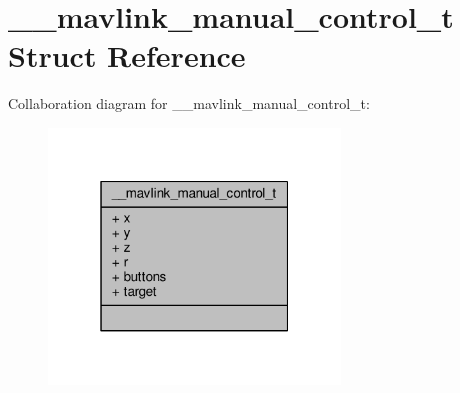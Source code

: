 \hypertarget{struct____mavlink__manual__control__t}{\section{\+\_\+\+\_\+mavlink\+\_\+manual\+\_\+control\+\_\+t Struct Reference}
\label{struct____mavlink__manual__control__t}
}


Collaboration diagram for \+\_\+\+\_\+mavlink\+\_\+manual\+\_\+control\+\_\+t\+:
\nopagebreak
\begin{figure}[H]
\begin{center}
\leavevmode
\includegraphics[width=220pt]{struct____mavlink__manual__control__t__coll__graph}
\end{center}
\end{figure}
